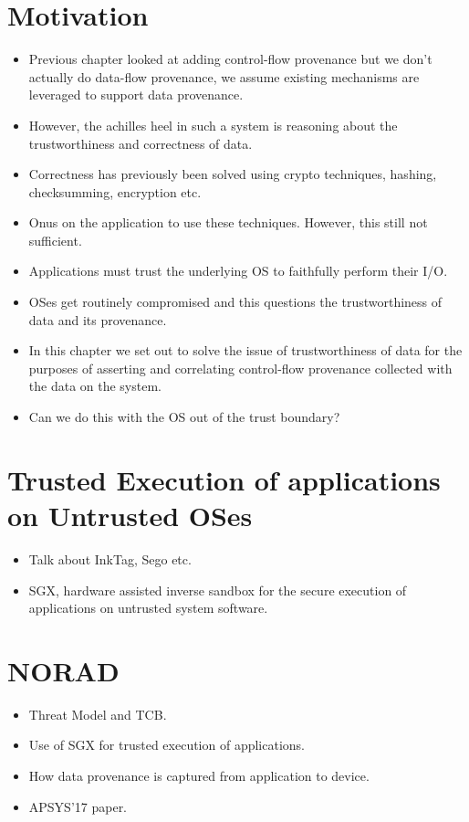 \documentclass[withindex,glossary]{cam-thesis}
\begin{document}
\section{Motivation}
\begin{itemize}
\item Previous chapter looked at adding control-flow provenance but we don't actually do data-flow provenance, we assume existing mechanisms are leveraged to support data provenance.
\item However, the achilles heel in such a system is reasoning about the trustworthiness and correctness of data.
\item Correctness has previously been solved using crypto techniques, hashing, checksumming, encryption etc.
\item Onus on the application to use these techniques. However, this still not sufficient.
\item Applications must trust the underlying OS to faithfully perform their I/O.
\item OSes get routinely compromised and this questions the trustworthiness of data and its provenance.
\item In this chapter we set out to solve the issue of trustworthiness of data for the purposes of asserting and correlating control-flow provenance collected with the data on the system.
\item Can we do this with the OS out of the trust boundary?
\end{itemize}

\section{Trusted Execution of applications on Untrusted OSes}
\begin{itemize}
\item Talk about InkTag, Sego etc.
\item SGX, hardware assisted inverse sandbox for the secure execution of applications on untrusted system software.
\end{itemize}

\section{NORAD}
\begin{itemize}
\item Threat Model and TCB.
\item Use of SGX for trusted execution of applications.
\item How data provenance is captured from application to device.
\item APSYS'17 paper.
\end{itemize}
\end{document}
